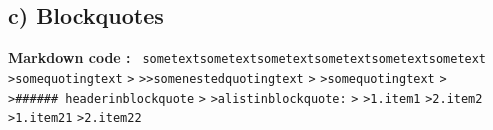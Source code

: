 \documentclass[11pt,a4paper]{report}
\begin{document}
{\subsection*{c) Blockquotes}{\bf Markdown code :}\texttt{\small
\mbox{}\newline \phantom{ }}\mbox{}\newline
\texttt{\small \phantom{ }some\phantom{ }text\phantom{ }some\phantom{ }text\phantom{ }some\phantom{ }text\phantom{ }some\phantom{ }text\phantom{ }some\phantom{ }text\phantom{ }some\phantom{ }text}\mbox{}\newline
\texttt{\small \phantom{ }}\mbox{}\newline
\texttt{\small \phantom{ }\textgreater \phantom{ }some\phantom{ }quoting\phantom{ }text}\mbox{}\newline
\texttt{\small \phantom{ }\textgreater \phantom{ }}\mbox{}\newline
\texttt{\small \phantom{ }\textgreater \phantom{ }\textgreater \phantom{ }some\phantom{ }nested\phantom{ }quoting\phantom{ }text\phantom{ }}\mbox{}\newline
\texttt{\small \phantom{ }\textgreater }\mbox{}\newline
\texttt{\small \phantom{ }\textgreater \phantom{ }some\phantom{ }quoting\phantom{ }text\phantom{ }}\mbox{}\newline
\texttt{\small \phantom{ }\textgreater \phantom{ }}\mbox{}\newline
\texttt{\small \phantom{ }\textgreater \phantom{ }\#\#\#\#\#\#\ header\phantom{ }in\phantom{ }blockquote}\mbox{}\newline
\texttt{\small \phantom{ }\textgreater }\mbox{}\newline
\texttt{\small \phantom{ }\textgreater \phantom{ }a\phantom{ }list\phantom{ }in\phantom{ }blockquote\phantom{ }:\phantom{ }}\mbox{}\newline
\texttt{\small \phantom{ }\textgreater \phantom{ }}\mbox{}\newline
\texttt{\small \phantom{ }\textgreater \phantom{ }1.\phantom{ }item1}\mbox{}\newline
\texttt{\small \phantom{ }\textgreater \phantom{ }2.\phantom{ }item2}\mbox{}\newline
\texttt{\small \phantom{ }\textgreater \phantom{ }\phantom{ }\phantom{ }\phantom{ }\phantom{ }1.\phantom{ }item21}\mbox{}\newline
\texttt{\small \phantom{ }\textgreater \phantom{ }\phantom{ }\phantom{ }\phantom{ }\phantom{ }2.\phantom{ }item22}\mbox{}\newline
}
\end{document}
